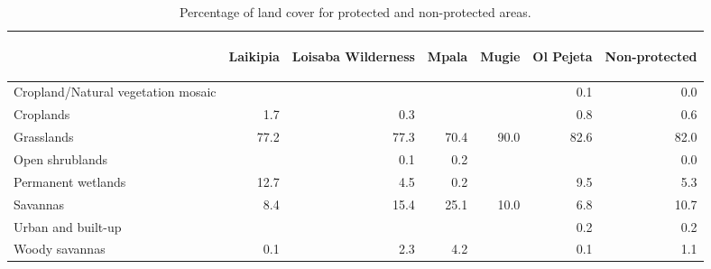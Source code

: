 \begin{table}[H]
\centering
\caption[Percentage of LC 
                                           for protected and non-protected 
                                           areas, Laikipia]{Percentage of land cover 
                                           for protected and non-protected 
                                           areas.} 
\label{table:mlc_percentage_wdpa_KEN}
\begin{tabular}{lrrrrrr}
  \toprule
\begin{sideways}  \end{sideways} & \begin{sideways} Laikipia \end{sideways} & \begin{sideways} Loisaba Wilderness \end{sideways} & \begin{sideways} Mpala \end{sideways} & \begin{sideways} Mugie \end{sideways} & \begin{sideways} Ol Pejeta \end{sideways} & \begin{sideways} Non-protected \end{sideways} \\ 
  \midrule
Cropland/Natural vegetation mosaic &  &  &  &  & 0.1 & 0.0 \\ 
  Croplands & 1.7 & 0.3 &  &  & 0.8 & 0.6 \\ 
  Grasslands & 77.2 & 77.3 & 70.4 & 90.0 & 82.6 & 82.0 \\ 
  Open shrublands &  & 0.1 & 0.2 &  &  & 0.0 \\ 
  Permanent wetlands & 12.7 & 4.5 & 0.2 &  & 9.5 & 5.3 \\ 
  Savannas & 8.4 & 15.4 & 25.1 & 10.0 & 6.8 & 10.7 \\ 
  Urban and built-up &  &  &  &  & 0.2 & 0.2 \\ 
  Woody savannas & 0.1 & 2.3 & 4.2 &  & 0.1 & 1.1 \\ 
   \bottomrule
\end{tabular}
\end{table}
